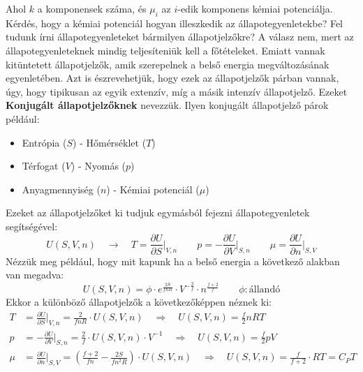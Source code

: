 \documentclass[a4paper,12pt]{article}
\begin{document}
Ahol $k$ a komponensek száma, és $\mu_i$ az $i$-edik komponens kémiai potenciálja.
\newline
\newline
Kérdés, hogy a kémiai potenciál hogyan illeszkedik az állapotegyenletekbe? Fel tudunk írni állapotegyenleteket bármilyen állapotjelzőkre?
A válasz nem, mert az állapotegyenleteknek mindig teljesíteniük kell a főtételeket. Emiatt vannak kitüntetett állapotjelzők, amik szerepelnek a
belső energia megváltozásának egyenletében. Azt is észrevehetjük, hogy ezek az állapotjelzők párban vannak, úgy, hogy tipikusan az egyik extenzív, míg a másik intenzív állapotjelző.
Ezeket \textbf{Konjugált állapotjelzőknek} nevezzük. Ilyen konjugált állapotjelző párok például:
\begin{itemize}
    \item Entrópia ($S$) - Hőmérséklet ($T$)
    \item Térfogat ($V$) - Nyomás ($p$)
    \item Anyagmennyiség ($n$) - Kémiai potenciál ($\mu$)
\end{itemize}
Ezeket az állapotjelzőket ki tudjuk egymásból fejezni állapotegyenletek segítségével:
\begin{equation}
    U(S, V, n) \quad \to \quad T = \frac{\partial U}{\partial S}\bigg|_{V,n} \qquad p = - \frac{\partial U}{\partial V}\bigg|_{S,n} \qquad \mu = \frac{\partial U}{\partial n}\bigg|_{S,V}
\end{equation}
Nézzük meg például, hogy mit kapunk ha a belső energia a következő alakban van megadva:
\begin{equation}
    U(S, V, n) = \phi \cdot e^{\frac{2S}{fnR}} \cdot V^{-\frac{2}{f}} \cdot n^{\frac{f + 2}{f}} \qquad \phi: \text{állandó}
\end{equation}
Ekkor a különböző állapotjelzők a következőképpen néznek ki:
\begin{equation}
    \begin{aligned}
        T &= \frac{\partial U}{\partial S}\bigg|_{V,n} = \frac{2}{f n R} \cdot U(S, V, n) \quad \Rightarrow \quad U(S, V, n) = \frac{f}{2} n R T \\
        p &= - \frac{\partial U}{\partial V}\bigg|_{S,n} = \frac{2}{f} \cdot U(S, V, n) \cdot V^{-1} \quad \Rightarrow \quad U(S, V, n) = \frac{f}{2} p V \\
        \mu &= \frac{\partial U}{\partial n}\bigg|_{S,V} = \left(\frac{f + 2}{f n} - \frac{2S}{f n^2 R}\right) \cdot U(S, V, n) \quad \Rightarrow \quad U(S, V, n) = \frac{f}{f + 2} \cdot RT = C_P T
    \end{aligned}   
\end{equation}
\end{document}
